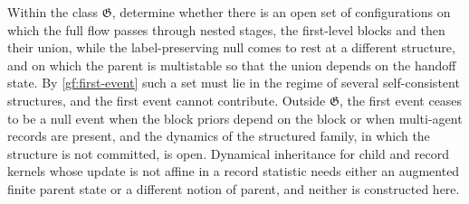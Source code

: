 Within the class $\mathfrak G$, determine whether there is an open set of
configurations on which the full flow passes through nested stages, the
first-level blocks and then their union, while the label-preserving null
comes to rest at a different structure, and on which the parent is
multistable so that the union depends on the handoff state. By
\cref{gf:first-event} such a set must lie in the regime of several
self-consistent structures, and the first event cannot contribute. Outside
$\mathfrak G$, the first event ceases to be a null event when the block
priors depend on the block or when multi-agent records are present, and the
dynamics of the structured family, in which the structure is not committed,
is open. Dynamical inheritance for child and record kernels whose update is
not affine in a record statistic needs either an augmented finite parent
state or a different notion of parent, and neither is constructed here.

